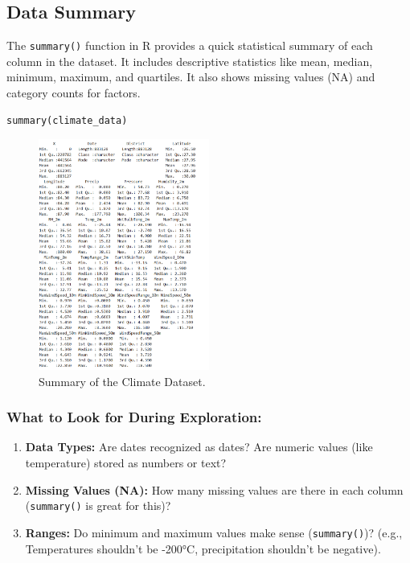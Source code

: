 \subsection{Data Summary}

The \texttt{summary()} function in R provides a quick statistical summary of each column in the dataset. It includes descriptive statistics like mean, median, minimum, maximum, and quartiles. It also shows missing values (NA) and category counts for factors.

\begin{verbatim}
summary(climate_data)
\end{verbatim}

\begin{figure}[h!]
    \centering
     \includegraphics[width=0.5\textwidth]{figures/summary.png}
    \caption{Summary of the Climate Dataset.}
\end{figure}

\subsubsection*{What to Look for During Exploration:}

\begin{enumerate}
    \item \textbf{Data Types:} Are dates recognized as dates? Are numeric values (like temperature) stored as numbers or text?
    \item \textbf{Missing Values (NA):} How many missing values are there in each column (\texttt{summary()} is great for this)?
    \item \textbf{Ranges:} Do minimum and maximum values make sense (\texttt{summary()})? (e.g., Temperatures shouldn’t be -200°C, precipitation shouldn’t be negative).
\end{enumerate}
